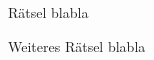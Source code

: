 \documentclass{uebungszettel}
\begin{document}

\begin{aufgabe}{R\"atsel}
blabla
\end{aufgabe}

\begin{aufgabe}{Weiteres R\"atsel}
blabla
\end{aufgabe}
\end{document}

